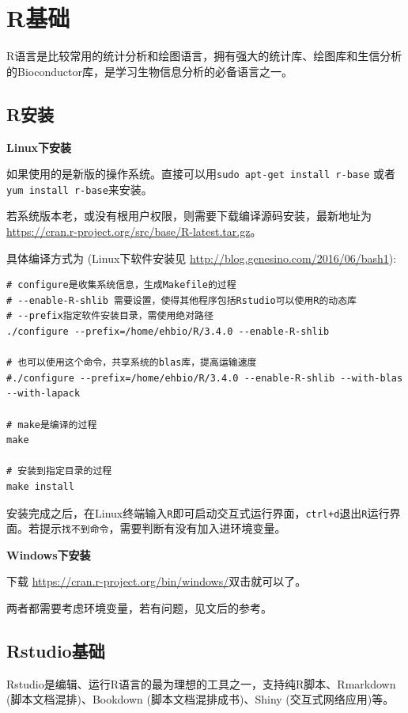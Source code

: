 \documentclass[]{article}
\numberwithin{figure}{section}
\numberwithin{table}{section}
\theoremstyle{definition}
\theoremstyle{definition}
\theoremstyle{definition}
\theoremstyle{remark}
\begin{document}
\section{R基础}\label{Rbasic}

R语言是比较常用的统计分析和绘图语言，拥有强大的统计库、绘图库和生信分析的Bioconductor库，是学习生物信息分析的必备语言之一。

\subsection{R安装}\label{r}

\textbf{Linux下安装}

如果使用的是新版的操作系统。直接可以用\texttt{sudo\ apt-get\ install\ r-base}
或者\texttt{yum\ install\ r-base}来安装。

若系统版本老，或没有根用户权限，则需要下载编译源码安装，最新地址为\url{https://cran.r-project.org/src/base/R-latest.tar.gz}。

具体编译方式为 (Linux下软件安装见
\url{http://blog.genesino.com/2016/06/bash1}):

\begin{verbatim}
# configure是收集系统信息，生成Makefile的过程
# --enable-R-shlib 需要设置，使得其他程序包括Rstudio可以使用R的动态库
# --prefix指定软件安装目录，需使用绝对路径
./configure --prefix=/home/ehbio/R/3.4.0 --enable-R-shlib

# 也可以使用这个命令，共享系统的blas库，提高运输速度
#./configure --prefix=/home/ehbio/R/3.4.0 --enable-R-shlib --with-blas --with-lapack

# make是编译的过程
make

# 安装到指定目录的过程
make install
\end{verbatim}

安装完成之后，在Linux终端输入\texttt{R}即可启动交互式运行界面，\texttt{ctrl+d}退出\texttt{R}运行界面。若提示\texttt{找不到命令}，需要判断有没有加入进环境变量。

\textbf{Windows下安装}

下载 \url{https://cran.r-project.org/bin/windows/}双击就可以了。

两者都需要考虑环境变量，若有问题，见文后的参考。

\subsection{Rstudio基础}\label{rstudio}

Rstudio是编辑、运行R语言的最为理想的工具之一，支持纯R脚本、Rmarkdown
(脚本文档混排)、Bookdown (脚本文档混排成书)、Shiny (交互式网络应用)等。
\end{document}
